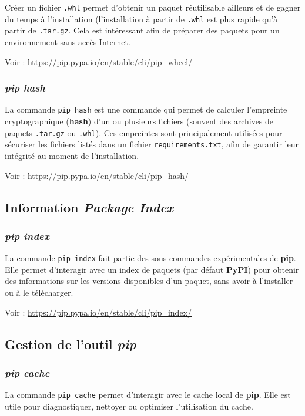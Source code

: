 Créer un fichier \texttt{.whl} permet d'obtenir un paquet réutilisable ailleurs et de gagner du temps à l’installation (l’installation à partir de \texttt{.whl} est plus rapide qu’à partir de \texttt{.tar.gz}. Cela est intéressant afin de préparer des paquets pour un environnement sans accès Internet.

Voir : \url{https://pip.pypa.io/en/stable/cli/pip_wheel/}

\subsubsection*{\textit{pip hash}}
La commande \texttt{pip hash} est une commande qui permet de calculer l’empreinte cryptographique (\textbf{hash}) d’un ou plusieurs fichiers (souvent des archives de paquets \texttt{.tar.gz} ou \texttt{.whl}). Ces empreintes sont principalement utilisées pour sécuriser les fichiers listés dans un fichier \texttt{requirements.txt}, afin de garantir leur intégrité au moment de l’installation.

Voir : \url{https://pip.pypa.io/en/stable/cli/pip_hash/}

\subsection*{Information \textit{Package Index}}
\subsubsection*{\textit{pip index}}
La commande \texttt{pip index} fait partie des sous-commandes expérimentales de \textbf{pip}. Elle permet d’interagir avec un index de paquets (par défaut \textbf{PyPI}) pour obtenir des informations sur les versions disponibles d’un paquet, sans avoir à l’installer ou à le télécharger.

Voir : \url{https://pip.pypa.io/en/stable/cli/pip_index/}

\subsection*{Gestion de l'outil \textit{pip}}
\subsubsection*{\textit{pip cache}}
La commande \texttt{pip cache} permet d’interagir avec le cache local de \textbf{pip}. Elle est utile pour diagnostiquer, nettoyer ou optimiser l'utilisation du cache.

